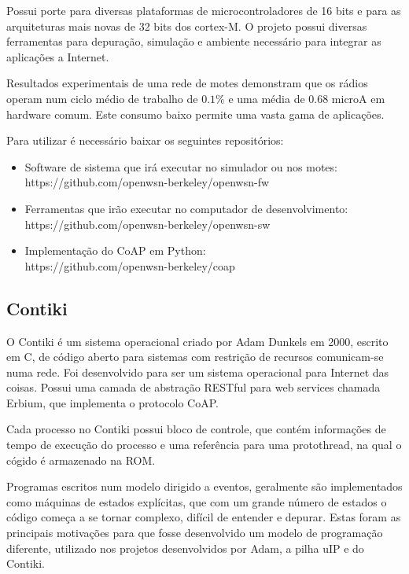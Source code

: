 Possui porte para diversas plataformas de microcontroladores de 16 bits e para as arquiteturas mais novas de 32 bits dos cortex-M. O projeto possui diversas ferramentas para depura\c{c}\~ao, simula\c{c}\~ao e ambiente necess\'ario para integrar as aplica\c{c}\~oes a Internet.\cite{openWSN}

Resultados experimentais de uma rede de motes demonstram que os r\'adios operam num ciclo m\'edio de trabalho de $0.1\%$ e uma m\'edia de 0.68 microA em hardware comum. Este consumo baixo permite uma vasta gama de aplica\c{c}\~oes.

Para utilizar \'e necess\'ario baixar os seguintes reposit\'orios:
\begin{itemize}
    \item Software de sistema que ir\'a executar no simulador ou nos motes:\\https://github.com/openwsn-berkeley/openwsn-fw
    \item Ferramentas que ir\~ao executar no computador de desenvolvimento:\\https://github.com/openwsn-berkeley/openwsn-sw 
    \item Implementa\c{c}\~ao do CoAP em Python:\\https://github.com/openwsn-berkeley/coap
\end{itemize}


\subsection{Contiki}
O Contiki \'e um sistema operacional criado por Adam Dunkels em 2000, escrito em C, de c\'odigo aberto para sistemas com restri\c{c}\~ao de recursos comunicam-se numa rede. Foi desenvolvido para ser um sistema operacional para Internet das coisas. Possui uma camada de abstra\c{c}\~ao RESTful para web services chamada Erbium, que implementa o protocolo CoAP.

Cada processo no Contiki possui bloco de controle, que cont\'em informa\-\c{c}\~oes de tempo de execu\c{c}\~ao do processo e uma refer\^encia para uma protothread, na qual o c\'ogido \'e armazenado na ROM. 

Programas escritos num modelo dirigido a eventos, geralmente s\~ao implementados como m\'aquinas de estados expl\'icitas, que com um grande n\'umero de estados o c\'odigo come\c{c}a a se tornar complexo, dif\'icil de entender e depurar. Estas foram as principais motiva\c{c}\~oes para que fosse desenvolvido um modelo de programa\c{c}\~ao diferente, utilizado nos projetos desenvolvidos por Adam, a pilha uIP e do Contiki.\cite{Dunkels05protothreads}


